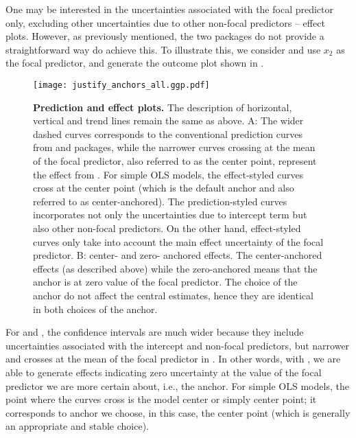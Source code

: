 One may be interested in the uncertainties associated with the focal predictor only, excluding other uncertainties due to other non-focal predictors -- effect plots. However, as previously mentioned, the two packages do not provide a straightforward way do achieve this. To illustrate this, we consider  and use $x_2$ as the focal predictor, and generate the outcome plot shown in . 
%
\begin{figure}
\begin{center}
\texttt{[image: justify\_anchors\_all.ggp.pdf]}
\end{center}
\caption{{\bf Prediction and effect plots.} The description of horizontal, vertical and trend lines remain the same as above. A: The wider dashed curves corresponds to the conventional prediction curves from  and  packages, while the narrower curves crossing at the mean of the focal predictor, also referred to as the center point, represent the effect from . For simple OLS models, the effect-styled curves cross at the center point (which is the default anchor and also referred to as center-anchored). The prediction-styled curves incorporates not only the uncertainties due to intercept term but also other non-focal predictors. On the other hand, effect-styled curves only take into account the main effect uncertainty of the focal predictor. B: center- and zero- anchored effects. The center-anchored effects (as described above) while the zero-anchored means that the anchor is at zero value of the focal predictor. The choice of the anchor do not affect the central estimates, hence they are identical in both choices of the anchor.}
\label{fig:justify_ci_plots}
\end{figure}
%
For  and , the confidence intervals are much wider because they include uncertainties associated with the intercept and non-focal predictors, but narrower and crosses at the mean of the focal predictor in . In other words, with , we are able to generate effects indicating zero uncertainty at the value of the focal predictor we are more certain about, i.e., the anchor. For simple OLS models, the point where the curves cross is the model center or simply center point; it corresponds to anchor we choose, in this case, the center point (which is generally an appropriate and stable choice). 

